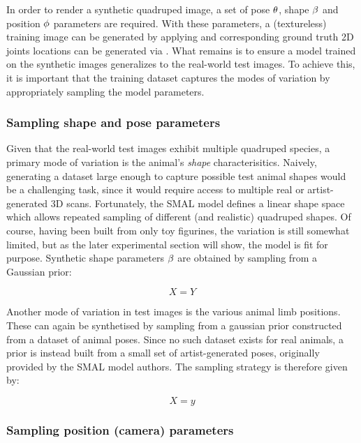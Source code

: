 In order to render a synthetic quadruped image, a set of pose $\theta$, shape $\beta$ and position $\phi$ parameters are required. With these parameters, a (textureless) training image can be generated by applying  and corresponding ground truth 2D joints locations can be generated via . What remains is to ensure a model trained on the synthetic images generalizes to the real-world test images. To achieve this, it is important that the training dataset captures the modes of variation by appropriately sampling the model parameters. 

\subsubsection{Sampling shape and pose parameters}

Given that the real-world test images exhibit multiple quadruped species, a primary mode of variation is the animal's \emph{shape} characterisitics. Naively, generating a dataset large enough to capture possible test animal shapes would be a challenging task, since it would require access to multiple real or artist-generated 3D scans. Fortunately, the SMAL model defines a linear shape space which allows repeated sampling of different (and realistic) quadruped shapes. Of course, having been built from only toy figurines, the variation is still somewhat limited, but as the later experimental section will show, the model is fit for purpose. Synthetic shape parameters $\beta$ are obtained by sampling from a Gaussian prior:

\begin{equation}\label{eq:sampling_shape}
X = Y
\end{equation}

Another mode of variation in test images is the various animal limb positions. These can again be synthetised by sampling from a gaussian prior constructed from a dataset of animal poses. Since no such dataset exists for real animals, a prior is instead built from a small set of artist-generated poses, originally provided by the SMAL model authors. The sampling strategy is therefore given by:


\begin{equation}\label{eq:sampling_pose}
    X = y
\end{equation}


\subsubsection{Sampling position (camera) parameters}

